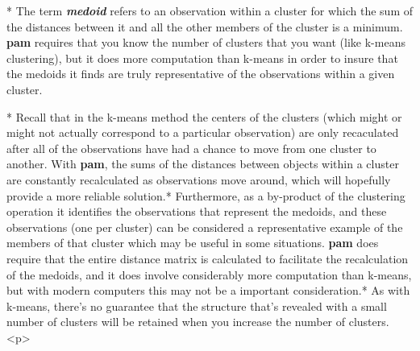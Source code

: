 *  The term\textbf{ \textit{medoid}} refers to an observation within a cluster for which the sum of the distances between it and all the other members of the cluster is a minimum. \textbf{pam} requires that you know the number of clusters that you want (like k-means clustering), but it does more computation than k-means in order to insure that the medoids it finds are truly representative of the observations within a given cluster. 

*   Recall that in the k-means method the centers of the clusters (which might or might not actually correspond to a particular observation) are only recaculated after all of the observations have had a chance to move from one cluster to another. With \textbf{pam}, the sums of the distances between objects within a cluster are constantly recalculated as observations move around, which will hopefully provide a more reliable solution.* Furthermore, as a by-product of the clustering operation it identifies the observations that represent the medoids, and these observations (one per cluster) can be considered a representative example of the members of that cluster which may be useful in some situations. \textbf{pam} does require that the entire distance matrix is calculated to facilitate the recalculation of the medoids, and it does involve considerably more computation than k-means, but with modern computers this may not be a important consideration.* As with k-means, there's no guarantee that the structure that's revealed with a small number of clusters will be retained when you increase the number of clusters.
<p>

